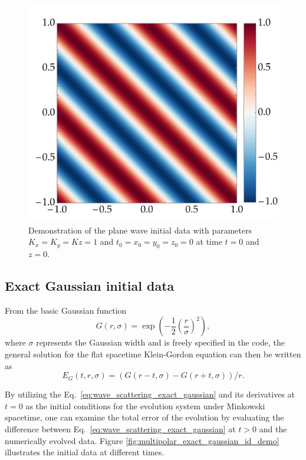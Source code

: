 \begin{figure}[!ht]
  \centering
  \includegraphics[width=0.5\linewidth]{img/wave_scattering/plane_wave_id_examples.png}
  \caption{Demonstration of the plane wave initial data with parameters $K_x = K_y = Kz = 1$ and $t_0 = x_0 = y_0 = z_0 = 0$ at time $t=0$ and $z=0$.}
  \label{fig:multipolar_plane_wave_id_demo}
\end{figure}

\subsection{Exact Gaussian initial data}

From the basic Gaussian function
%
\begin{equation}
  G(r, \sigma) = \exp\left( -\frac{1}{2} \left( \frac{r}{\sigma} \right)^2  \right),
  \label{eq:wave_scattering_gaussian}
\end{equation}
%
where $\sigma$ represents the Gaussian width and is freely specified in the code, the general solution for the flat spacetime Klein-Gordon equation can then be written as
\begin{equation}
  E_G(t, r, \sigma) = \left( G(r-t, \sigma) - G(r+t, \sigma) \right) / r.
  \label{eq:wave_scattering_exact_gaussian}
\end{equation}

By utilizing the Eq.~\eqref{eq:wave_scattering_exact_gaussian} and its derivatives at $t=0$ as the initial conditions for the evolution system under Minkowski spacetime, one can examine the total error of the evolution by evaluating the difference between Eq.~\eqref{eq:wave_scattering_exact_gaussian} at $t>0$ and the numerically evolved data. Figure \ref{fig:multipolar_exact_gaussian_id_demo} illustrates the initial data at different times.

